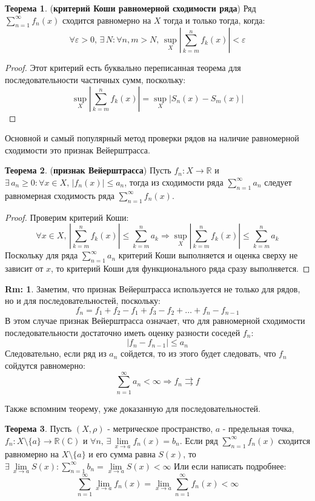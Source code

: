 \documentclass[12pt]{article}
\newcommand{\MR}{\mathbb{R}}
\newcommand{\MC}{\mathbb{C}}
\newcommand{\VE}{\varepsilon}
\theoremstyle{definition}
\newtheorem{rem}{Rm:}
\newtheorem{theorem}{Теорема}
\newcommand{\uconv}[1]{\overset{#1}{\rightrightarrows}}
\begin{document}
\begin{theorem}(\textbf{критерий Коши равномерной сходимости ряда})
	Ряд $\displaystyle \sum\limits_{n = 1}^{\infty}f_n(x)$ сходится равномерно на $X$ тогда и только тогда, когда:
	$$
		\forall \VE > 0, \, \exists \, N \colon \forall n,m > N, \, \sup\limits_{X}\left| \sum\limits_{k = m}^{n} f_k(x)\right| < \VE
	$$
\end{theorem}
\begin{proof}
	Этот критерий есть буквально переписанная теорема для последовательности частичных сумм, поскольку:
	$$
		\sup\limits_{X}\left| \sum\limits_{k = m}^{n} f_k(x)\right| = \sup\limits_{X}\left| S_n(x) - S_m(x) \right|
	$$
\end{proof}
Основной и самый популярный метод проверки рядов на наличие равномерной сходимости это признак Вейерштрасса.
\begin{theorem}(\textbf{признак Вейерштрасса})
	Пусть $f_n \colon X \to \MR$ и $\exists \, a_n \geq 0 \colon \forall x \in X, \, |f_n(x)| \leq a_n$, тогда из сходимости ряда $\displaystyle \sum\limits_{n = 1}^{\infty}a_n$ следует равномерная сходимость ряда $\displaystyle \sum\limits_{n = 1}^{\infty}f_n(x)$.
\end{theorem}
\begin{proof}
	Проверим критерий Коши:
	$$
		\forall x \in X, \, \left| \sum\limits_{k = m}^{n} f_k(x)\right| \leq \sum\limits_{k = m}^n a_k \Rightarrow \sup\limits_{X}\left| \sum\limits_{k = m}^{n} f_k(x)\right| \leq \sum\limits_{k = m}^n a_k
	$$
	Поскольку для ряда $\displaystyle \sum\limits_{n = 1}^{\infty}a_n$ критерий Коши выполняется и оценка сверху не зависит от $x$, то критерий Коши для функционального ряда сразу выполняется.
\end{proof}
\begin{rem}
	Заметим, что признак Вейерштрасса используется не только для рядов, но и для последовательностей, поскольку:
	$$
		f_n = f_1 + f_2 - f_1 + f_3 - f_2 + \dotsc + f_n - f_{n-1}
	$$
	В этом случае признак Вейерштрасса означает, что для равномерной сходимости последовательности достаточно иметь оценку разности соседей $f_n$:
	$$
		|f_n - f_{n-1}| \leq a_n 
	$$
	Следовательно, если ряд из $a_n$ сойдется, то из этого будет следовать, что $f_n$ сойдутся равномерно:
	$$
		\sum\limits_{n = 1}^{\infty}a_n < \infty \Rightarrow f_n \uconv{} f
	$$
\end{rem}
Также вспомним теорему, уже доказанную для последовательностей.
\begin{theorem}
	Пусть $(X,\rho)$ - метрическое пространство, $a$ - предельная точка, $f_n \colon X\setminus \{a\} \to \MR(\MC)$ и $\forall n, \, \exists \, \lim\limits_{x \to a} f_n(x) = b_n$. Если ряд $\displaystyle \sum\limits_{n = 1}^{\infty}f_n(x)$ сходится равномерно на $X \setminus \{a\}$ и его сумма равна $S(x)$, то $\exists \, \lim\limits_{x \to a} S(x)\colon \sum\limits_{n = 1}^{\infty}b_n = \lim\limits_{x \to a} S(x) < \infty$
	Или если написать подробнее:
	$$
		\sum\limits_{n = 1}^{\infty}\lim\limits_{x \to a}f_n(x) = \lim\limits_{x \to a} \sum\limits_{n =1}^{\infty}f_n(x) < \infty
	$$
\end{theorem}
\end{document}
